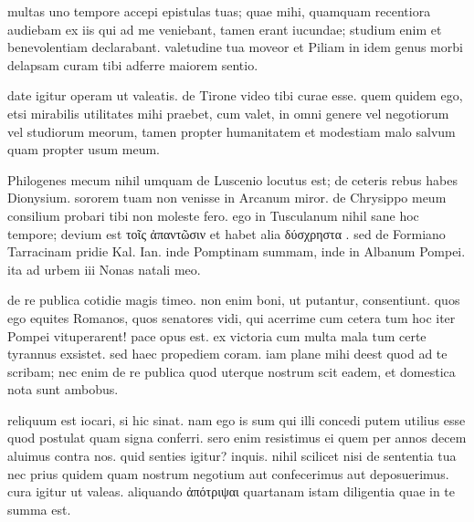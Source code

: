 


 multas uno tempore accepi epistulas tuas; quae mihi, quamquam recentiora audiebam ex iis qui ad me veniebant, tamen erant iucundae; studium enim et benevolentiam declarabant. valetudine tua moveor et Piliam in idem genus morbi delapsam curam tibi adferre maiorem sentio.

 date igitur operam ut valeatis. de Tirone video tibi curae esse. quem quidem ego, etsi mirabilis utilitates mihi praebet, cum valet, in omni genere vel negotiorum vel studiorum meorum, tamen propter humanitatem et modestiam malo salvum quam propter usum meum.

 Philogenes mecum nihil umquam de Luscenio locutus est; de ceteris rebus habes Dionysium. sororem tuam non venisse in Arcanum miror. de Chrysippo meum consilium probari tibi non moleste fero. ego in Tusculanum nihil sane hoc tempore; devium est τοῖς ἀπαντῶσιν et habet alia δύσχρηστα . sed de Formiano Tarracinam pridie Kal. Ian. inde Pomptinam summam, inde in Albanum Pompei. ita ad urbem iii Nonas natali meo.

 de re publica cotidie magis timeo. non enim boni, ut putantur, consentiunt. quos ego equites Romanos, quos senatores vidi, qui acerrime cum cetera tum hoc iter Pompei vituperarent! pace opus est. ex victoria cum multa mala tum certe tyrannus exsistet. sed haec propediem coram. iam plane mihi deest quod ad te scribam; nec enim de re publica quod uterque nostrum scit eadem, et domestica nota sunt ambobus.

 reliquum est iocari, si hic sinat. nam ego is sum qui illi concedi putem utilius esse quod postulat quam signa conferri. sero enim resistimus ei quem per annos decem aluimus contra nos. quid senties igitur? inquis. nihil scilicet nisi de sententia tua nec prius quidem quam nostrum negotium aut confecerimus aut deposuerimus. cura igitur ut valeas. aliquando ἀπότριψαι quartanam istam diligentia quae in te summa est.
